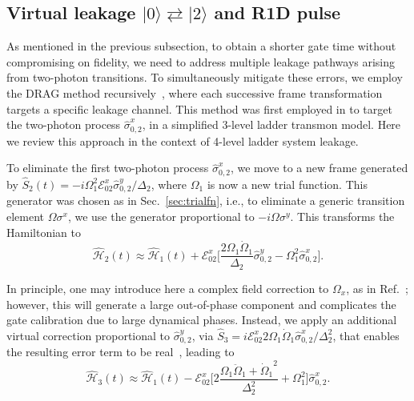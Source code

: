 \documentclass[superscriptaddress,amsmath,amssymb,aps,twocolumn,praplied,notitlepage]{revtex4-2}
\newcommand{\ket}[1]{\vert #1 \rangle}
\begin{document}
\subsection{Virtual leakage $\ket{0}\rightleftarrows\ket{2}$ and R1D pulse}
\label{R1D}

As mentioned in the previous subsection, to obtain a shorter gate time without compromising on fidelity, we need to address multiple leakage pathways arising from two-photon transitions. To simultaneously mitigate these errors, we employ the DRAG method recursively~\cite{PhysRevA.88.062318,Theis2018Counteracting,Li2024Experimental}, where each successive frame transformation targets a specific leakage channel. { This method was first employed in \cite{PhysRevA.88.062318} to target the two-photon process \(\hat{\sigma}_{0,2}^x\), in a simplified 3-level ladder transmon model. Here we review this approach in the context of 4-level ladder system leakage. }

To eliminate the first two-photon process \(\hat{\sigma}_{0,2}^x\), we move to a {new} frame generated by $\hat{S}_2(t) = -i\Omega_1^2 \mathcal{E}^x_{02}\hat{\sigma}_{0,2}^y/\Delta_2$, where $\Omega_1$ is now a new trial function. {This generator was chosen as in Sec.~\ref{sec:trialfn}, i.e., to eliminate a generic transition element $\Omega \sigma^x$, we use the generator proportional to $-i\Omega \sigma^y$}. 
This transforms the Hamiltonian to 
\begin{equation}
    \hat{\mathcal{H}}_2(t) \approx\hat{\mathcal{H}}_1(t) + \mathcal{E}^x_{02} \bigg[\frac{2\Omega_1\dot\Omega_1}{\Delta_2}\hat{\sigma}_{0,2}^y-\Omega_1^2\hat{\sigma}_{0,2}^x\bigg].
\end{equation} 

{In principle, one may introduce here a complex field correction to $\Omega_x$, as in Ref.~\cite{Li2024Experimental}; however, this will generate a large out-of-phase component and complicates the gate calibration due to large dynamical phases.}
Instead, we apply an additional virtual correction proportional to $\hat{\sigma}_{0,2}^y$, via $\hat{S}_3 = i\mathcal{E}^x_{02}2\Omega_1\dot\Omega_1 \hat{\sigma}_{0,2}^x/\Delta_2^2 $, 
that enables the resulting error term to be real~\cite{PhysRevA.88.062318, Wang2025Suppressinga}, leading to 
\begin{equation}
    \hat{\mathcal{H}}_3(t)  \approx\hat{\mathcal{H}}_1(t)
    - \mathcal{E}^x_{02} \bigg[2\frac{\Omega_1\ddot\Omega_1+{\dot\Omega_1}^2}{\Delta_2^2}+\Omega_1^2\bigg]\hat{\sigma}_{0,2}^x.
\end{equation} 
 
\end{document}
